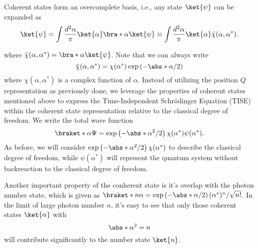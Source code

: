 Coherent states form an overcomplete basis, i.e., any state \(\ket{\psi}\) can be expanded as
\begin{equation}
    \label{eq:class_jcm_eq20}
    \ket{\psi} = \int \frac{d^2\alpha}{\pi} \ket{\alpha}\bra*{\alpha}\ket{\psi} \equiv 
    \int \frac{d^2\alpha}{\pi} \ket{\alpha}\Tilde{\chi}(\alpha, \alpha^*).
\end{equation}

where \(\Tilde{\chi}(\alpha, \alpha^*) = \bra*{\alpha}\ket{\psi}\). Note that we can 
always write  
\[\Tilde{\chi}(\alpha, \alpha^*) = \chi(\alpha^*)\exp\left(-\abs*{\alpha}/2\right)\]
where \(\chi(\alpha, \alpha^*)\) is a complex function of \(\alpha\). Instead of utilizing the position
$Q$ representation as previously done, we leverage the properties of coherent states mentioned 
above to express the Time-Independent Schrödinger Equation (TISE) within the coherent state 
representation relative to the classical degree of freedom. We write the total wave function
\begin{equation}
    \label{eq:class_jcm_eq21}
    \braket*{\alpha}{\Psi} = \exp\left(-\abs*{\alpha}^2/2\right)\chi(\alpha^*)\psi(\alpha^*).
\end{equation}
As before, we will consider \( \exp\left(-\abs*{\alpha}^2/2\right)\chi(\alpha^*)\) to 
describe the classical degree of freedom, while \(\psi(\alpha^*)\) will represent the 
quantum system without backreaction to the classical degree of freedom.

Another important property of the conherent state is it's overlap with the  photon number state, 
which is given as \( \braket*{n}{\alpha} = \exp\left(-\abs*{\alpha}/2\right) (\alpha^*)^n/\sqrt{n!} \). 
In the limit of large photon number \(n\), it's easy to see that only those coherent states 
\(\ket{\alpha}\) with 
\begin{equation}
    \label{eq:class_jcm_eq22}
    \abs*{\alpha}^2 = n
\end{equation}
will contribute significantly to the number state \(\ket{n}\).


